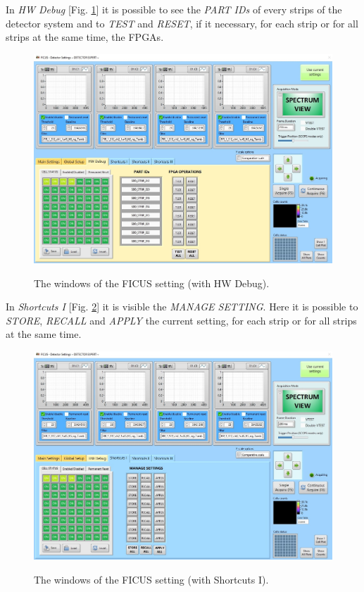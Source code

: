 \documentclass[a4paper,12pt,oneside,pdflatex,italian,final,twocolumn]{article}
\begin{document}
In \textit{HW Debug} [Fig. \ref{fig:fig12}] it is possible to see the \textit{PART IDs} of every strips of the detector system and to \textit{TEST} and \textit{RESET}, if it necessary, for each strip or for all strips at the same time, the FPGAs.

\begin{figure}[h]
\centering
{\includegraphics[width=.85\textwidth]{Capture10.jpg}} \quad
\caption{The windows of the FICUS setting (with HW Debug).}\label{fig:fig12}
\end{figure}

In \textit{Shortcuts I} [Fig. \ref{fig:fig13}] it is visible the \textit{MANAGE SETTING}. Here it is possible to \textit{STORE}, \textit{RECALL} and \textit{APPLY} the current setting, for each strip or for all strips at the same time.

\begin{figure}[h]
\centering
{\includegraphics[width=.85\textwidth]{Capture11.jpg}} \quad
\caption{The windows of the FICUS setting (with Shortcuts I).}\label{fig:fig13} 
\end{figure}
\end{document}

